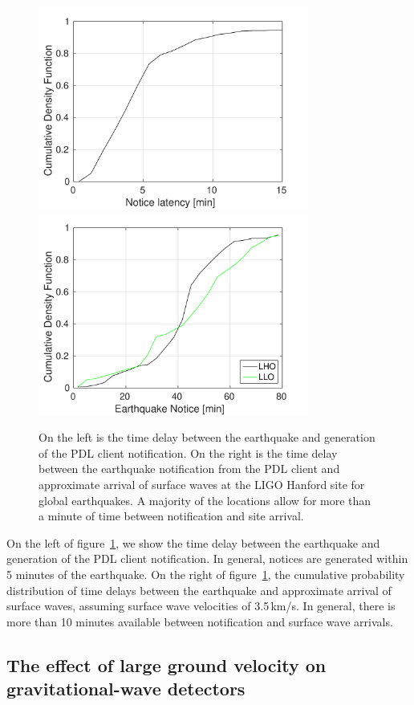 \documentclass[reprint, prl, aps, showpacs]{revtex4-1}
\begin{document}
\begin{figure}[t]
\hspace*{-0.5cm}
 \includegraphics[width=3.5in]{earthquake_notice.pdf}
 \includegraphics[width=3.5in]{lockloss_notice.pdf}
 \caption{On the left is the time delay between the earthquake and generation of the PDL client notification. On the right is the time delay between the earthquake notification from the PDL client and approximate arrival of surface waves at the LIGO Hanford site for global earthquakes. A majority of the locations allow for more than a minute of time between notification and site arrival.}
 \label{fig:delays}
\end{figure}

On the left of figure~\ref{fig:delays}, we show the time delay between the earthquake and generation of the PDL client notification. In general, notices are generated within 5 minutes of the earthquake. On the right of figure~\ref{fig:delays},
the cumulative probability distribution of time delays between the earthquake and approximate arrival of surface waves, assuming surface wave velocities of 3.5\,km/s. 
In general, there is more than 10 minutes available between notification and surface wave arrivals.

\subsection{The effect of large ground velocity on gravitational-wave detectors}
\end{document}
